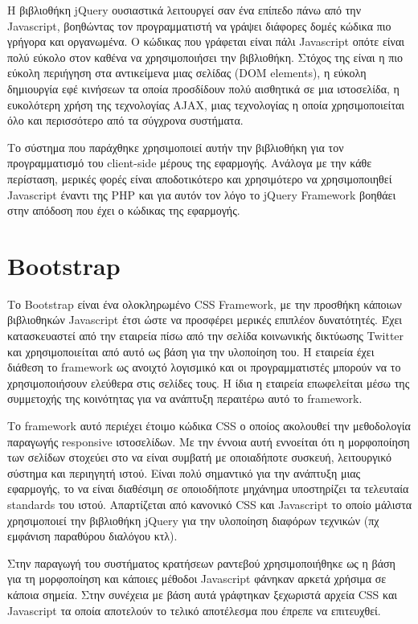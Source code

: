 Η βιβλιοθήκη jQuery ουσιαστικά λειτουργεί σαν ένα επίπεδο πάνω από την Javascript, βοηθώντας τον προγραμματιστή να γράψει διάφορες δομές κώδικα πιο γρήγορα και οργανωμένα. Ο κώδικας που γράφεται είναι πάλι Javascript οπότε είναι πολύ εύκολο στον καθένα να χρησιμοποιήσει την βιβλιοθήκη. Στόχος της είναι η πιο εύκολη περιήγηση στα αντικείμενα μιας σελίδας (DOM elements), η εύκολη δημιουργία εφέ κινήσεων τα οποία προσδίδουν πολύ αισθητικά σε μια ιστοσελίδα, η ευκολότερη χρήση της τεχνολογίας AJAX, μιας τεχνολογίας η οποία χρησιμοποιείται όλο και περισσότερο από τα σύγχρονα συστήματα.

Το σύστημα που παράχθηκε χρησιμοποιεί αυτήν την βιβλιοθήκη για τον προγραμματισμό του client-side μέρους της εφαρμογής. Ανάλογα με την κάθε περίσταση, μερικές φορές είναι αποδοτικότερο και χρησιμότερο να χρησιμοποιηθεί Javascript έναντι της PHP και για αυτόν τον λόγο το jQuery Framework βοηθάει στην απόδοση που έχει ο κώδικας της εφαρμογής.

\section {Bootstrap}
Το Bootstrap είναι ένα ολοκληρωμένο CSS Framework, με την προσθήκη κάποιων βιβλιοθηκών Javascript έτσι ώστε να προσφέρει μερικές επιπλέον δυνατότητές. Έχει κατασκευαστεί από την εταιρεία πίσω από την σελίδα κοινωνικής δικτύωσης Twitter και χρησιμοποιείται από αυτό ως βάση για την υλοποίηση του. Η εταιρεία έχει διάθεση το framework ως ανοιχτό λογισμικό και οι προγραμματιστές μπορούν να το χρησιμοποιήσουν ελεύθερα στις σελίδες τους. Η ίδια η εταιρεία επωφελείται μέσω της συμμετοχής της κοινότητας για να ανάπτυξη περαιτέρω αυτό το framework.

Το framework αυτό περιέχει έτοιμο κώδικα CSS ο οποίος ακολουθεί την μεθοδολογία παραγωγής responsive ιστοσελίδων. Με την έννοια αυτή εννοείται ότι η μορφοποίηση των σελίδων στοχεύει στο να είναι συμβατή με οποιαδήποτε συσκευή, λειτουργικό σύστημα και περιηγητή ιστού. Είναι πολύ σημαντικό για την ανάπτυξη μιας εφαρμογής, το να είναι διαθέσιμη σε οποιοδήποτε μηχάνημα υποστηρίζει τα τελευταία standards του ιστού. Απαρτίζεται από κανονικό CSS και Javascript το οποίο μάλιστα χρησιμοποιεί την βιβλιοθήκη jQuery για την υλοποίηση διαφόρων τεχνικών (πχ εμφάνιση παραθύρου διαλόγου κτλ).

Στην παραγωγή του συστήματος κρατήσεων ραντεβού χρησιμοποιήθηκε ως η βάση για τη μορφοποίηση και κάποιες μέθοδοι Javascript φάνηκαν αρκετά χρήσιμα σε κάποια σημεία. Στην συνέχεια με βάση αυτά γράφτηκαν ξεχωριστά αρχεία CSS και Javascript τα οποία αποτελούν το τελικό αποτέλεσμα που έπρεπε να επιτευχθεί. 